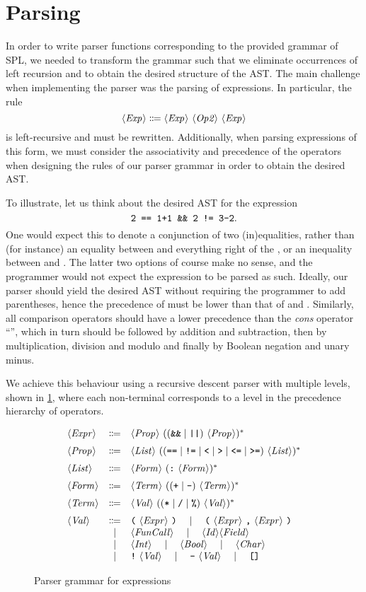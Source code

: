 \section{Parsing}
In order to write parser functions corresponding to the provided grammar of SPL,
we needed to transform the grammar such that we eliminate occurrences of left
recursion and to obtain the desired structure of the AST.
The main challenge when implementing the parser was the parsing of expressions.
In particular, the rule
\[ \langle \textit{Exp}\kern.7pt \rangle \Coloneqq \langle \textit{Exp}\kern.7pt \rangle\ \langle \textit{Op2}\kern.7pt \rangle\ \langle \textit{Exp}\kern.7pt \rangle \]
is left-recursive and must be rewritten.
Additionally, when parsing expressions of this form, we must consider the
associativity and precedence of the operators when designing the rules of our
parser grammar in order to obtain the desired AST.

To illustrate, let us think about the desired AST for the expression
\[ \texttt{2 == 1+1 \&\& 2 != 3-2} .\]
One would expect this to denote a conjunction of two (in)equalities, rather than
(for instance) an equality between  and everything right of the
\code{==}, or an inequality between  and .
The latter two options of course make no sense, and the programmer would not
expect the expression to be parsed as such.
Ideally, our parser should yield the desired AST without requiring the
programmer to add parentheses, hence the precedence of \code{\&\&} must be lower
than that of \code{==} and \code{!=}.
Similarly, all comparison operators should have a lower precedence than the
\emph{cons} operator ``\code{:}'', which in turn should be followed by addition
and subtraction, then by multiplication, division and modulo and finally by
Boolean negation and unary minus.

We achieve this behaviour using a recursive descent parser with multiple levels,
shown in \cref{fig:new-expr-grammar}, where each non-terminal corresponds to a
level in the precedence hierarchy of operators.

\begin{figure}[h]
  \[
  \begin{array}{lcl}
		\NT{Expr} & \Coloneqq & \NT{Prop}\ ((\code{\&\&} \mid \code{||})\ \NT{Prop})^* \br
		\NT{Prop} & \Coloneqq & \NT{List}\ ((\code{==} \mid \code{!=} \mid \code{<} \mid \code{>} \mid \code{<=} \mid \code{>=})\ \NT{List})^* \br
		\NT{List} & \Coloneqq & \NT{Form}\ (\code{:}\ \NT{Form})^* \br
		\NT{Form} & \Coloneqq & \NT{Term}\ (( \code{+} \mid \code{-} )\ \NT{Term})^* \br
		\NT{Term} & \Coloneqq & \NT{Val}\ (( \code{*} \mid \code{/} \mid \code{\%} )\ \NT{Val} )^* \br
		\NT{Val} & \Coloneqq & \code{(}\ \NT{Expr}\ \code{)} \ruleSep
      \code{(}\ \NT{Expr}\ \code{,}\ \NT{Expr}\ \code{)} \\
		& \mid & \NT{FunCall} \ruleSep
      \NT{Id} \NT{Field} \\
    & \mid & \NT{Int} \ruleSep \NT{Bool} \ruleSep \NT{Char} \\
		& \mid & \code{!}\ \NT{Val} \ruleSep \code{-}\ \NT{Val} \ruleSep \code{[]}
  \end{array}
  \]
  \caption{Parser grammar for expressions}
  \label{fig:new-expr-grammar}
\end{figure}


